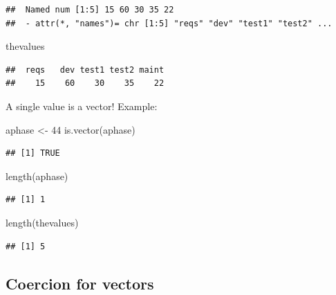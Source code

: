 \documentclass[
]{book}
\newenvironment{Shaded}{\begin{snugshade}}{\end{snugshade}}
\newcommand{\DecValTok}[1]{\textcolor[rgb]{0.00,0.00,0.81}{#1}}
\newcommand{\FunctionTok}[1]{\textcolor[rgb]{0.00,0.00,0.00}{#1}}
\newcommand{\NormalTok}[1]{#1}
\newcommand{\OtherTok}[1]{\textcolor[rgb]{0.56,0.35,0.01}{#1}}
\begin{document}
\begin{verbatim}
##  Named num [1:5] 15 60 30 35 22
##  - attr(*, "names")= chr [1:5] "reqs" "dev" "test1" "test2" ...
\end{verbatim}

\begin{Shaded}
\begin{Highlighting}[]
\NormalTok{thevalues}
\end{Highlighting}
\end{Shaded}

\begin{verbatim}
##  reqs   dev test1 test2 maint 
##    15    60    30    35    22
\end{verbatim}

A single value is a vector! Example:

\begin{Shaded}
\begin{Highlighting}[]
\NormalTok{aphase }\OtherTok{\textless{}{-}} \DecValTok{44}
\FunctionTok{is.vector}\NormalTok{(aphase)}
\end{Highlighting}
\end{Shaded}

\begin{verbatim}
## [1] TRUE
\end{verbatim}

\begin{Shaded}
\begin{Highlighting}[]
\FunctionTok{length}\NormalTok{(aphase)}
\end{Highlighting}
\end{Shaded}

\begin{verbatim}
## [1] 1
\end{verbatim}

\begin{Shaded}
\begin{Highlighting}[]
\FunctionTok{length}\NormalTok{(thevalues)}
\end{Highlighting}
\end{Shaded}

\begin{verbatim}
## [1] 5
\end{verbatim}

\hypertarget{coercion-for-vectors}{%
\subsection{Coercion for vectors}\label{coercion-for-vectors}}
\end{document}
